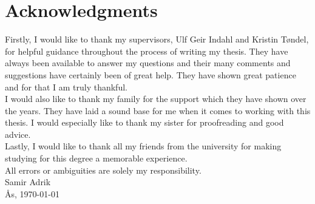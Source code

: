 \documentclass[../thesis.tex]{subfiles}
\begin{document}
\chapter*{Acknowledgments}

\noindent Firstly, I would like to thank my supervisors, Ulf Geir Indahl and Kristin Tøndel, for helpful guidance throughout the process of writing my thesis. They have always been available to answer my questions and their many comments and suggestions have certainly been of great help. They have shown great patience and for that I am truly thankful.\\

\noindent I would also like to thank my family for the support which they have shown over the years. They have laid a sound base for me when it comes to working with this thesis. I would especially like to thank my sister for proofreading and good advice.\\

\noindent Lastly, I would like to thank all my friends from the university for making studying for this degree a memorable experience. \\

\noindent All errors or ambiguities are solely my responsibility.\\

\noindent Samir Adrik\\
Ås, \today

\newpage{\pagestyle{empty}\cleardoublepage}
\end{document}
